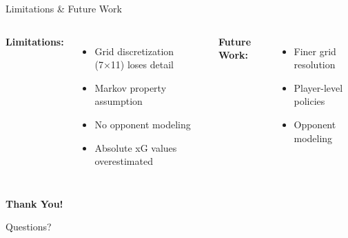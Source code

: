 \documentclass[aspectratio=169]{beamer}
\begin{document}
\begin{frame}{Limitations \& Future Work}
\begin{columns}[T]
\textbf{Limitations:}
\begin{itemize}
    \item Grid discretization (7×11) loses detail
    \item Markov property assumption
    \item No opponent modeling
    \item Absolute xG values overestimated
\end{itemize}

\textbf{Future Work:}
\begin{itemize}
    \item Finer grid resolution
    \item Player-level policies
    \item Opponent modeling
\end{itemize}
\end{columns}

\vspace{0.5cm}
\begin{center}
\Large \textbf{Thank You!}

\vspace{0.3cm}
\normalsize Questions?
\end{center}
\end{frame}
\end{document}
